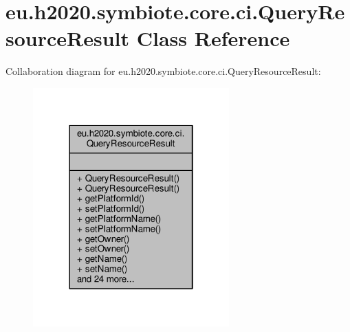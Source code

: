 \hypertarget{classeu_1_1h2020_1_1symbiote_1_1core_1_1ci_1_1QueryResourceResult}{}\section{eu.\+h2020.\+symbiote.\+core.\+ci.\+Query\+Resource\+Result Class Reference}
\label{classeu_1_1h2020_1_1symbiote_1_1core_1_1ci_1_1QueryResourceResult}


Collaboration diagram for eu.\+h2020.\+symbiote.\+core.\+ci.\+Query\+Resource\+Result\+:
\nopagebreak
\begin{figure}[H]
\begin{center}
\leavevmode
\includegraphics[width=214pt]{classeu_1_1h2020_1_1symbiote_1_1core_1_1ci_1_1QueryResourceResult__coll__graph}
\end{center}
\end{figure}
